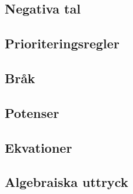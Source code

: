 \subsection{Negativa tal}

\subsection{Prioriteringsregler}

\subsection{Bråk}

\subsection{Potenser}

\subsection{Ekvationer}

\subsection{Algebraiska uttryck}
